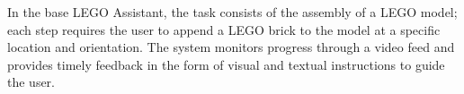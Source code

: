 \documentclass[10pt,letterpaper]{article}
\providecommand{\DIFaddtex}[1]{#1} %
\providecommand{\DIFdeltex}[1]{} %
\providecommand{\DIFaddbegin}{\protect\color{blue}} %
\providecommand{\DIFaddend}{\protect\color{black}} %
\providecommand{\DIFdelbegin}{\protect\color{red}} %
\providecommand{\DIFdelend}{\protect\color{black}} %
\providecommand{\DIFadd}[1]{\texorpdfstring{\DIFaddtex{#1}}{#1}} %
\providecommand{\DIFdel}[1]{\texorpdfstring{\DIFdeltex{#1}}{}} %
\newcommand{\DIFscaledelfig}{0.5}
\newlength{\DIFdelgraphicswidth} %
\newlength{\DIFdelgraphicsheight} %
\newcommand{\DIFaddincludegraphics}[2][]{{\color{blue}\fbox{\DIFOincludegraphics[#1]{#2}}}} %
\newcommand{\DIFdelincludegraphics}[2][]{%
\sbox{\DIFdelgraphicsbox}{\DIFOincludegraphics[#1]{#2}}%
\settoboxwidth{\DIFdelgraphicswidth}{\DIFdelgraphicsbox} %
\settoboxtotalheight{\DIFdelgraphicsheight}{\DIFdelgraphicsbox} %
\scalebox{\DIFscaledelfig}{%
\parbox[b]{\DIFdelgraphicswidth}{\usebox{\DIFdelgraphicsbox}\\[-\baselineskip] \rule{\DIFdelgraphicswidth}{0em}}\llap{\resizebox{\DIFdelgraphicswidth}{\DIFdelgraphicsheight}{%
\setlength{\unitlength}{\DIFdelgraphicswidth}%
\begin{picture}(1,1)%
\thicklines\linethickness{2pt} %
{\color[rgb]{1,0,0}\put(0,0){\framebox(1,1){}}}%
{\color[rgb]{1,0,0}\put(0,0){\line( 1,1){1}}}%
{\color[rgb]{1,0,0}\put(0,1){\line(1,-1){1}}}%
\end{picture}%
}\hspace*{3pt}}} %
} %
\DeclareRobustCommand{\DIFaddbegin}{\DIFOaddbegin \let\includegraphics\DIFaddincludegraphics} %
\DeclareRobustCommand{\DIFaddend}{\DIFOaddend \let\includegraphics\DIFOincludegraphics} %
\DeclareRobustCommand{\DIFdelbegin}{\DIFOdelbegin \let\includegraphics\DIFdelincludegraphics} %
\DeclareRobustCommand{\DIFdelend}{\DIFOaddend \let\includegraphics\DIFOincludegraphics} %
\begin{document}



\DIFaddend In the base LEGO Assistant, the task consists of \DIFdelbegin \DIFdel{steps leading the user through the }\DIFdelend \DIFaddbegin \DIFadd{the }\DIFaddend assembly of a LEGO model; each \DIFdelbegin \DIFdel{subtask }\DIFdelend \DIFaddbegin \DIFadd{step }\DIFaddend requires the user to append a LEGO brick to the model at a specific location and orientation.
The system monitors progress through a video feed and provides timely feedback in the form of visual and textual instructions to guide the user\DIFdelbegin \DIFdel{towards the desired end result}\DIFdelend . 
\end{document}
